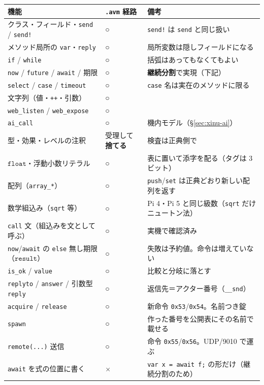 \documentclass[11pt,a4paper]{ltjsarticle}
\newcommand{\ty}[1]{\ensuremath{\mathtt{#1}}}
\begin{document}
\begin{center}
\small
\begin{tabular}{@{}lll@{}}
\toprule
機能 & \texttt{.avm} 経路 & 備考 \\
\midrule
クラス・フィールド・\texttt{send} / \texttt{send!} & ○ & \texttt{send!} は \texttt{send} と同じ扱い \\
メソッド局所の \texttt{var}・\texttt{reply} & ○ & 局所変数は隠しフィールドになる \\
\texttt{if} / \texttt{while} & ○ & 括弧はあってもなくてもよい \\
\texttt{now} / \texttt{future} / \texttt{await} / 期限 & ○ & \textbf{継続分割}で実現（下記） \\
\texttt{select} / \texttt{case} / \texttt{timeout} & ○ & \texttt{case} 名は実在のメソッドに限る \\
文字列（値・\texttt{++}・引数） & ○ & \\
\texttt{web\_listen} / \texttt{web\_expose} & ○ & \\
\texttt{ai\_call} & ○ & 機内モデル（\S\ref{sec:xinu-ai}） \\
\midrule
型・効果・レベルの注釈 & 受理して\textbf{捨てる} & 検査は正典側で \\
\ty{float}・浮動小数リテラル & ○ & 表に置いて添字を配る（タグは 3 ビット） \\
配列（\texttt{array\_*}） & ○ & \texttt{push}/\texttt{set} は正典どおり新しい配列を返す \\
数学組込み（\texttt{sqrt} 等） & ○ & Pi 4・Pi 5 と同じ級数（\texttt{sqrt} だけニュートン法） \\
\texttt{call} 文（組込みを文として呼ぶ） & ○ & 実機で確認済み \\
\texttt{now}/\texttt{await} の \texttt{else} 無し期限（\ty{result}） & ○ & 失敗は予約値。命令は増えていない \\
\texttt{is\_ok} / \texttt{value} & ○ & 比較と分岐に落とす \\
\texttt{replyto} / \texttt{answer} / 引数型 \texttt{reply} & ○ & 返信先＝アクター番号（\texttt{\_\_snd}） \\
\texttt{acquire} / \texttt{release} & ○ & 新命令 \texttt{0x53}/\texttt{0x54}。名前つき錠 \\
\texttt{spawn} & ○ & 作った番号を公開表にその名前で載せる \\
\texttt{remote(...)} 送信 & ○ & 命令 \texttt{0x55}/\texttt{0x56}。UDP/9010 で運ぶ \\
\texttt{await} を式の位置に書く & × & \texttt{var x = await f;} の形だけ（継続分割のため） \\
\bottomrule
\end{tabular}
\end{center}
\end{document}
